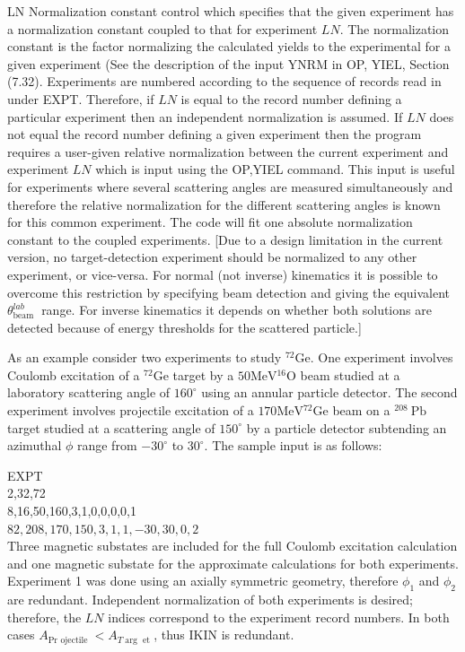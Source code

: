 \documentclass[10pt]{article}
\begin{document}
LN Normalization constant control which specifies that the given experiment has a normalization constant coupled to that for experiment $L N$. The normalization constant is the factor normalizing the calculated yields to the experimental for a given experiment (See the description of the input YNRM in OP, YIEL, Section (7.32). Experiments are numbered according to the sequence of records read in under EXPT. Therefore, if $L N$ is equal to the record number defining a particular experiment then an independent normalization is assumed. If $L N$ does not equal the record number defining a given experiment then the program requires a user-given relative normalization between the current experiment and experiment $L N$ which is input using the OP,YIEL command. This input is useful for experiments where several scattering angles are measured simultaneously and therefore the relative normalization for the different scattering angles is known for this common experiment. The code will fit one absolute normalization constant to the coupled experiments. [Due to a design limitation in the current version, no target-detection experiment should be normalized to any other experiment, or vice-versa. For normal (not inverse) kinematics it is possible to overcome this restriction by specifying beam detection and giving the equivalent $\theta_{\text {beam }}^{l a b}$ range. For inverse kinematics it depends on whether both solutions are detected because of energy thresholds for the scattered particle.]

As an example consider two experiments to study ${ }^{72} \mathrm{Ge}$. One experiment involves Coulomb excitation of a ${ }^{72} \mathrm{Ge}$ target by a $50 \mathrm{MeV}{ }^{16} \mathrm{O}$ beam studied at a laboratory scattering angle of $160^{\circ}$ using an annular particle detector. The second experiment involves projectile excitation of a $170 \mathrm{MeV}{ }^{72} \mathrm{Ge}$ beam on a ${ }^{208} \mathrm{~Pb}$ target studied at a scattering angle of $150^{\circ}$ by a particle detector subtending an azimuthal $\phi$ range from $-30^{\circ}$ to $30^{\circ}$. The sample input is as follows:

EXPT\\
2,32,72\\
8,16,50,160,3,1,0,0,0,0,1\\
$82,208,170,150,3,1,1,-30,30,0,2$\\
Three magnetic substates are included for the full Coulomb excitation calculation and one magnetic substate for the approximate calculations for both experiments. Experiment 1 was done using an axially symmetric geometry, therefore $\phi_{1}$ and $\phi_{2}$ are redundant. Independent normalization of both experiments is desired; therefore, the $L N$ indices correspond to the experiment record numbers. In both cases $A_{\text {Pr ojectile }}<A_{T \arg \text { et }}$, thus IKIN is redundant.
\end{document}
